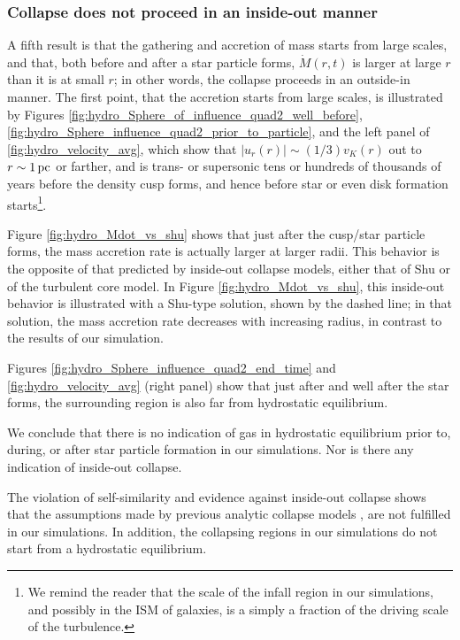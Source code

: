 \documentclass[../dissertation.tex]{subfiles}
\begin{document}
\subsubsection{Collapse does not proceed in an inside-out manner}

A fifth result is that the gathering and accretion of mass starts from large scales, 
and that, both before and after a star particle forms, $\dot M(r,t)$ is larger at 
large $r$ than it is at small $r$; in other words, the collapse proceeds in an outside-in manner.
The first point, that the accretion starts from large scales, is illustrated by 
Figures \ref{fig:hydro_Sphere_of_influence_quad2_well_before},
\ref{fig:hydro_Sphere_influence_quad2_prior_to_particle}, and the left panel of
\ref{fig:hydro_velocity_avg}, which show that $|u_r(r)|\sim (1/3) v_K(r)$ out to $r\sim 1\,\rm pc$ or
farther, and is trans- or supersonic tens or hundreds of thousands of years before the
density cusp forms, and hence before star or even disk formation 
starts\footnote{We remind the 
reader that the scale of the infall region in our simulations, and possibly in the ISM of
galaxies, is a simply a fraction of the driving scale of the turbulence.}.

Figure \ref{fig:hydro_Mdot_vs_shu} shows that just after the cusp/star particle
forms, the mass accretion rate is actually larger at larger radii. This behavior is 
the opposite of that predicted by  
inside-out collapse models, either that of Shu or of the turbulent core model. In Figure
\ref{fig:hydro_Mdot_vs_shu}, this inside-out behavior is illustrated with a Shu-type solution, 
shown by the dashed line; in that solution, the mass accretion rate decreases 
with increasing radius, in contrast to the results of our simulation.

  

Figures \ref{fig:hydro_Sphere_influence_quad2_end_time} and \ref{fig:hydro_velocity_avg} (right panel) show
that just after and well after the star forms, the surrounding region is also far from
hydrostatic equilibrium.



We conclude that there is no indication of gas in hydrostatic equilibrium 
prior to, during, or after star particle formation in our simulations. Nor is there
any indication of inside-out collapse. 

The violation of self-similarity and evidence against inside-out collapse shows that the assumptions made by previous analytic collapse models
\citep{1977ApJ...214..488S,1992ApJ...396..631M,1997ApJ...476..750M,2003ApJ...585..850M}, 
are not fulfilled in our simulations.  In addition, 
the collapsing regions in our simulations do not start from a hydrostatic equilibrium.
\end{document}
